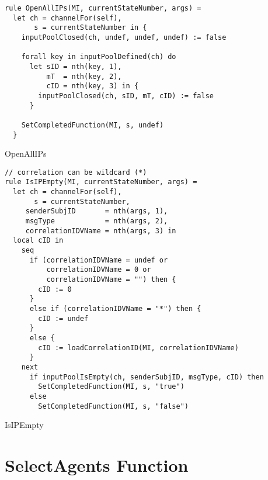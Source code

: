\begin{listing}[H]
\begin{verbatim}
rule OpenAllIPs(MI, currentStateNumber, args) =
  let ch = channelFor(self),
       s = currentStateNumber in {
    inputPoolClosed(ch, undef, undef, undef) := false

    forall key in inputPoolDefined(ch) do
      let sID = nth(key, 1),
          mT  = nth(key, 2),
          cID = nth(key, 3) in {
        inputPoolClosed(ch, sID, mT, cID) := false
      }

    SetCompletedFunction(MI, s, undef)
  }
\end{verbatim}
\caption{OpenAllIPs}
\label{lst:asm:OpenAllIPs}
\end{listing}




\begin{listing}[H]
\begin{verbatim}
// correlation can be wildcard (*)
rule IsIPEmpty(MI, currentStateNumber, args) =
  let ch = channelFor(self),
       s = currentStateNumber,
     senderSubjID       = nth(args, 1),
     msgType            = nth(args, 2),
     correlationIDVName = nth(args, 3) in
  local cID in
    seq
      if (correlationIDVName = undef or
          correlationIDVName = 0 or
          correlationIDVName = "") then {
        cID := 0
      }
      else if (correlationIDVName = "*") then {
        cID := undef
      }
      else {
        cID := loadCorrelationID(MI, correlationIDVName)
      }
    next
      if inputPoolIsEmpty(ch, senderSubjID, msgType, cID) then
        SetCompletedFunction(MI, s, "true")
      else
        SetCompletedFunction(MI, s, "false")
\end{verbatim}
\caption{IsIPEmpty}
\label{lst:asm:IsIPEmpty}
\end{listing}


\section{SelectAgents Function}


